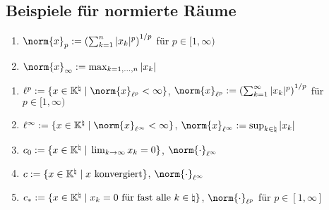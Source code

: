 \subsection{%
    Beispiele für normierte Räume%
}

\begin{Bsp}
    \begin{enumerate}[label=\emph{(\alph*)}]
        \item
        $\norm{x}_p := \left(\sum_{k=1}^n |x_k|^p\right)^{1/p}$ für $p \in [1, \infty)$

        \item
        $\norm{x}_\infty := \max_{k=1,\dotsc,n} |x_k|$
    \end{enumerate}
\end{Bsp}

\begin{Bsp}
    \begin{enumerate}[label=\emph{(\alph*)}]
        \item
        $\ell^p := \{x \in \KK^\natural \;|\;
        \norm{x}_{\ell^p} < \infty\}$, $\norm{x}_{\ell^p} :=
        \left(\sum_{k=1}^\infty |x_k|^p\right)^{1/p}$ für $p \in [1, \infty)$

        \item
        $\ell^\infty := \{x \in \KK^\natural \;|\;
        \norm{x}_{\ell^\infty} < \infty\}$, $\norm{x}_{\ell^\infty} :=
        \sup_{k \in \natural} |x_k|$

        \item
        $c_0 := \{x \in \mathbb{K}^\natural \;|\; \lim_{k \to \infty} x_k = 0\}$,
        $\norm{\cdot}_{\ell^\infty}$

        \item
        $c := \{x \in \mathbb{K}^\natural \;|\; x \text{ konvergiert}\}$,
        $\norm{\cdot}_{\ell^\infty}$

        \item
        $c_\ast := \{x \in \mathbb{K}^\natural \;|\; x_k = 0 \text{ für fast alle }
        k \in \natural\}$, $\norm{\cdot}_{\ell^p}$ für $p \in [1, \infty]$
    \end{enumerate}
\end{Bsp}

\linie
\pagebreak

